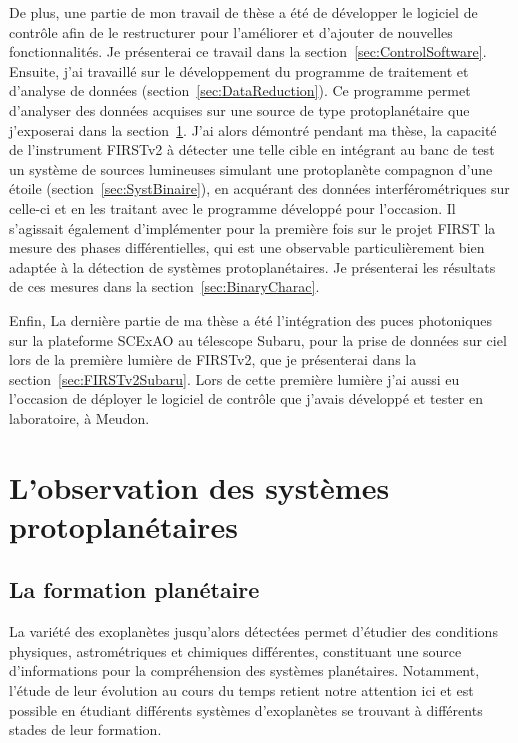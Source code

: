 De plus, une partie de mon travail de thèse a été de développer le logiciel de contrôle afin de le restructurer pour l'améliorer et d'ajouter de nouvelles fonctionnalités. Je présenterai ce travail dans la section~\ref{sec:ControlSoftware}. Ensuite, j'ai travaillé sur le développement du programme de traitement et d'analyse de données (section~\ref{sec:DataReduction}). Ce programme permet d'analyser des données acquises sur une source de type protoplanétaire que j'exposerai dans la section~\ref{sec:Protoplanetes}. J'ai alors démontré pendant ma thèse, la capacité de l'instrument \ac{FIRSTv2} à détecter une telle cible en intégrant au banc de test un système de sources lumineuses simulant une protoplanète compagnon d'une étoile (section~\ref{sec:SystBinaire}), en acquérant des données interférométriques sur celle-ci et en les traitant avec le programme développé pour l'occasion. Il s'agissait également d'implémenter pour la première fois sur le projet \ac{FIRST} la mesure des phases différentielles, qui est une observable particulièrement bien adaptée à la détection de systèmes protoplanétaires. Je présenterai les résultats de ces mesures dans la section~\ref{sec:BinaryCharac}. 

Enfin, La dernière partie de ma thèse a été l'intégration des puces photoniques sur la plateforme \ac{SCExAO} au télescope Subaru, pour la prise de données sur ciel lors de la première lumière de \ac{FIRSTv2}, que je présenterai dans la section~\ref{sec:FIRSTv2Subaru}. Lors de cette première lumière j'ai aussi eu l'occasion de déployer le logiciel de contrôle que j'avais développé et tester en laboratoire, à Meudon.


\section{L'observation des systèmes protoplanétaires}
\label{sec:Protoplanetes}

\subsection{La formation planétaire}

La variété des exoplanètes jusqu'alors détectées permet d'étudier des conditions physiques, astrométriques et chimiques différentes, constituant une source d'informations pour la compréhension des systèmes planétaires. Notamment, l'étude de leur évolution au cours du temps retient notre attention ici et est possible en étudiant différents systèmes d'exoplanètes se trouvant à différents stades de leur formation. 

